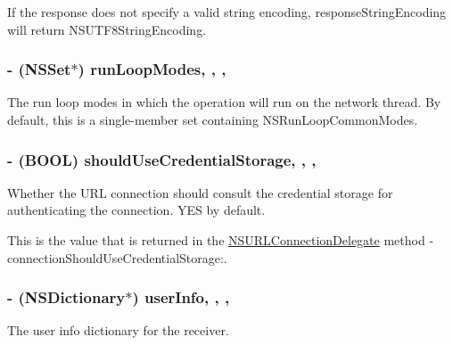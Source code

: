 If the response does not specify a valid string encoding, {\ttfamily response\-String\-Encoding} will return {\ttfamily N\-S\-U\-T\-F8\-String\-Encoding}. \hypertarget{interface_a_f_u_r_l_connection_operation_ac8a33d7fdd6314e92600318a79d60193}{
\subsubsection[{run\-Loop\-Modes}]{\setlength{\rightskip}{0pt plus 5cm}-\/ (N\-S\-Set$\ast$) run\-Loop\-Modes\hspace{0.3cm}{\ttfamily [read]}, {\ttfamily [write]}, {\ttfamily [nonatomic]}, {\ttfamily [strong]}}}\label{interface_a_f_u_r_l_connection_operation_ac8a33d7fdd6314e92600318a79d60193}
The run loop modes in which the operation will run on the network thread. By default, this is a single-\/member set containing {\ttfamily N\-S\-Run\-Loop\-Common\-Modes}. \hypertarget{interface_a_f_u_r_l_connection_operation_a48bd01b0c9afd1f5234d01d28e3764e7}{
\subsubsection[{should\-Use\-Credential\-Storage}]{\setlength{\rightskip}{0pt plus 5cm}-\/ (B\-O\-O\-L) should\-Use\-Credential\-Storage\hspace{0.3cm}{\ttfamily [read]}, {\ttfamily [write]}, {\ttfamily [nonatomic]}, {\ttfamily [assign]}}}\label{interface_a_f_u_r_l_connection_operation_a48bd01b0c9afd1f5234d01d28e3764e7}
Whether the U\-R\-L connection should consult the credential storage for authenticating the connection. {\ttfamily Y\-E\-S} by default.

This is the value that is returned in the {\ttfamily \hyperlink{class_n_s_u_r_l_connection_delegate-p}{N\-S\-U\-R\-L\-Connection\-Delegate}} method {\ttfamily -\/connection\-Should\-Use\-Credential\-Storage\-:}. \hypertarget{interface_a_f_u_r_l_connection_operation_a9e684ec568c6dd79497ef36b84511d15}{
\subsubsection[{user\-Info}]{\setlength{\rightskip}{0pt plus 5cm}-\/ (N\-S\-Dictionary$\ast$) user\-Info\hspace{0.3cm}{\ttfamily [read]}, {\ttfamily [write]}, {\ttfamily [nonatomic]}, {\ttfamily [strong]}}}\label{interface_a_f_u_r_l_connection_operation_a9e684ec568c6dd79497ef36b84511d15}
The user info dictionary for the receiver. 

